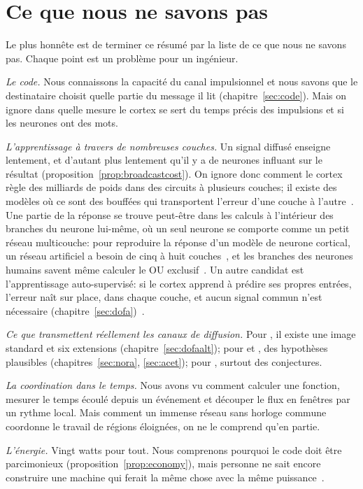 \section{Ce que nous ne savons pas}

Le plus honnête est de terminer ce résumé par la liste de ce que nous ne savons pas. Chaque point est un problème pour un ingénieur.

\emph{Le code.} Nous connaissons la capacité du canal impulsionnel et nous savons que le destinataire choisit quelle partie du message il lit (chapitre~\ref{sec:code}). Mais on ignore dans quelle mesure le cortex se sert du temps précis des impulsions et si les neurones ont des \og mots\fg{}.

\emph{L'apprentissage à travers de nombreuses couches.} Un signal diffusé enseigne lentement, et d'autant plus lentement qu'il y a de neurones influant sur le résultat (proposition~\ref{prop:broadcastcost}). On ignore donc comment le cortex règle des milliards de poids dans des circuits à plusieurs couches; il existe des modèles où ce sont des bouffées qui transportent l'erreur d'une couche à l'autre~\cite{Payeur2021}. Une partie de la réponse se trouve peut-être dans les calculs à l'intérieur des branches du neurone lui-même, où un seul neurone se comporte comme un petit réseau multicouche: pour reproduire la réponse d'un modèle de neurone cortical, un réseau artificiel a besoin de cinq à huit couches~\cite{Beniaguev2021}, et les branches des neurones humains savent même calculer le OU exclusif~\cite{Gidon2020}. Un autre candidat est l'apprentissage auto-supervisé: si le cortex apprend à prédire ses propres entrées, l'erreur naît sur place, dans chaque couche, et aucun signal commun n'est nécessaire (chapitre~\ref{sec:dofa})~\cite{Keller2018}.

\emph{Ce que transmettent réellement les canaux de diffusion.} Pour , il existe une image standard et six extensions (chapitre~\ref{sec:dofaalt}); pour  et , des hypothèses plausibles (chapitres~\ref{sec:nora}, \ref{sec:acet}); pour , surtout des conjectures.

\emph{La coordination dans le temps.} Nous avons vu comment calculer une fonction, mesurer le temps écoulé depuis un événement et découper le flux en fenêtres par un rythme local. Mais comment un immense réseau sans horloge commune coordonne le travail de régions éloignées, on ne le comprend qu'en partie.

\emph{L'énergie.} Vingt watts pour tout. Nous comprenons pourquoi le code doit être parcimonieux (proposition~\ref{prop:economy}), mais personne ne sait encore construire une machine qui ferait la même chose avec la même puissance~\cite{MehonicKenyon2022}.

